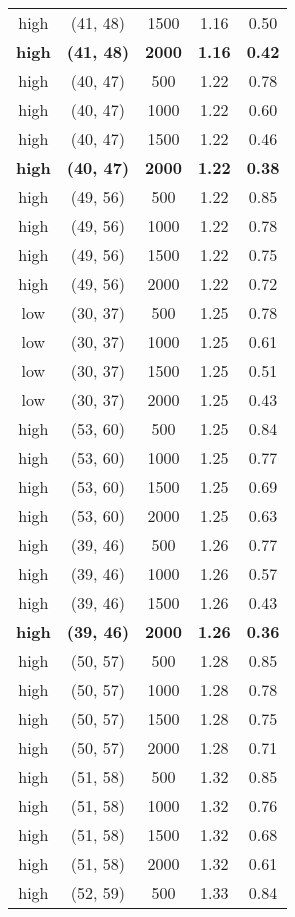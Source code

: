 \begin{tabular}{c c c c c}
high & (41, 48) &  1500 & 1.16 & 0.50 \\
\textbf{high} & \textbf{(41, 48)} & \textbf{ 2000} & \textbf{1.16} & \textbf{0.42} \\
high & (40, 47) &  500 & 1.22 & 0.78 \\
high & (40, 47) &  1000 & 1.22 & 0.60 \\
high & (40, 47) &  1500 & 1.22 & 0.46 \\
\textbf{high} & \textbf{(40, 47)} & \textbf{ 2000} & \textbf{1.22} & \textbf{0.38} \\
high & (49, 56) &  500 & 1.22 & 0.85 \\
high & (49, 56) &  1000 & 1.22 & 0.78 \\
high & (49, 56) &  1500 & 1.22 & 0.75 \\
high & (49, 56) &  2000 & 1.22 & 0.72 \\
low & (30, 37) &  500 & 1.25 & 0.78 \\
low & (30, 37) &  1000 & 1.25 & 0.61 \\
low & (30, 37) &  1500 & 1.25 & 0.51 \\
low & (30, 37) &  2000 & 1.25 & 0.43 \\
high & (53, 60) &  500 & 1.25 & 0.84 \\
high & (53, 60) &  1000 & 1.25 & 0.77 \\
high & (53, 60) &  1500 & 1.25 & 0.69 \\
high & (53, 60) &  2000 & 1.25 & 0.63 \\
high & (39, 46) &  500 & 1.26 & 0.77 \\
high & (39, 46) &  1000 & 1.26 & 0.57 \\
high & (39, 46) &  1500 & 1.26 & 0.43 \\
\textbf{high} & \textbf{(39, 46)} & \textbf{ 2000} & \textbf{1.26} & \textbf{0.36} \\
high & (50, 57) &  500 & 1.28 & 0.85 \\
high & (50, 57) &  1000 & 1.28 & 0.78 \\
high & (50, 57) &  1500 & 1.28 & 0.75 \\
high & (50, 57) &  2000 & 1.28 & 0.71 \\
high & (51, 58) &  500 & 1.32 & 0.85 \\
high & (51, 58) &  1000 & 1.32 & 0.76 \\
high & (51, 58) &  1500 & 1.32 & 0.68 \\
high & (51, 58) &  2000 & 1.32 & 0.61 \\
high & (52, 59) &  500 & 1.33 & 0.84 \\

\end{tabular}
